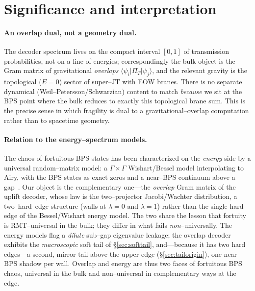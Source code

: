 \documentclass[11pt]{article}
\newcommand{\brak}[2]{\langle #1 | #2\rangle}
\newcommand{\PiT}{\Pi_T}
\begin{document}
\section{Significance and interpretation}
\label{sec:interp}

\paragraph{An overlap dual, not a geometry dual.}
The decoder spectrum lives on the compact interval $[0,1]$ of transmission probabilities, not on a
line of energies; correspondingly the bulk object is the Gram matrix of gravitational
\emph{overlaps} $\brak{\psi_i}{\PiT|\psi_j}$, and the relevant gravity is the topological ($E=0$)
sector of super--JT with EOW branes. There is no separate dynamical (Weil--Petersson/Schwarzian)
content to match \emph{because} we sit at the BPS point where the bulk reduces to exactly this
topological brane sum. This is the precise sense in which fragility is dual to a
gravitational--overlap computation rather than to spacetime geometry.

\paragraph{Relation to the energy--spectrum models.}
The chaos of fortuitous BPS states has been characterized on the \emph{energy} side by a universal
random--matrix model: a $\Gamma\times\Gamma$ Wishart/Bessel model interpolating to Airy, with the BPS
states as exact zeros and a near--BPS continuum above a gap~\cite{Johnson,ChangLin,LMRS,FF}. Our
object is the complementary one---the \emph{overlap} Gram matrix of the uplift decoder, whose law is
the two--projector Jacobi/Wachter distribution, a two--hard--edge structure (walls at $\lambda=0$ and
$\lambda=1$) rather than the single hard edge of the Bessel/Wishart energy model. The two share the
lesson that fortuity is RMT--universal in the bulk; they differ in what fails \emph{non}--universally.
The energy models flag a \emph{dilute} sub--gap eigenvalue leakage; the overlap decoder exhibits the
\emph{macroscopic} soft tail of \S\ref{sec:softtail}, and---because it has two hard edges---a second,
mirror tail above the upper edge (\S\ref{sec:tailorigin}), one near--BPS shadow per wall. Overlap and
energy are thus two faces of fortuitous BPS chaos, universal in the bulk and non--universal in
complementary ways at the edge.
\end{document}
